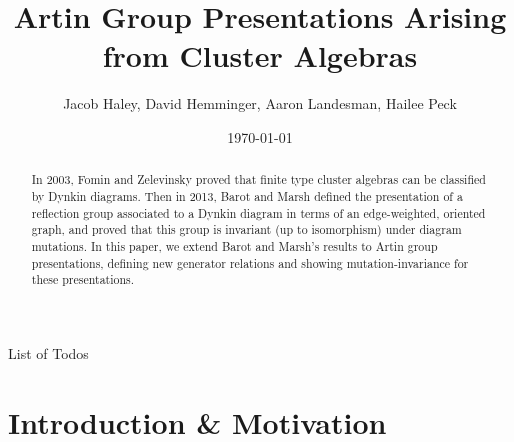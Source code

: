 \documentclass[11pt]{amsart}
\makeatletter
\theoremstyle{definition}
\def\listtodoname{List of Todos}
\def\listoftodos{\@starttoc{tdo}\listtodoname}
\makeatother
\begin{document}
\listoftodos




\title{Artin Group Presentations Arising from Cluster Algebras}
\author{Jacob Haley, David Hemminger, Aaron Landesman, Hailee Peck}
\address{you can put addresses for authors\\
here \\
Jacob: 225 St. Edward's Hall; Notre Dame, IN 46556}
\date{\today}

\begin{abstract}
In 2003, Fomin and Zelevinsky proved that finite type cluster algebras can be classified by Dynkin diagrams. Then in 2013, Barot and Marsh defined the presentation of a reflection group associated to a Dynkin diagram in terms of an edge-weighted, oriented graph, and proved that this group is invariant (up to isomorphism) under diagram mutations. In this paper, we extend Barot and Marsh's results to Artin group presentations, defining new generator relations and showing mutation-invariance for these presentations.
\end{abstract}

\maketitle

\section{Introduction \& Motivation}
\label{sec:Intro}
\end{document}
